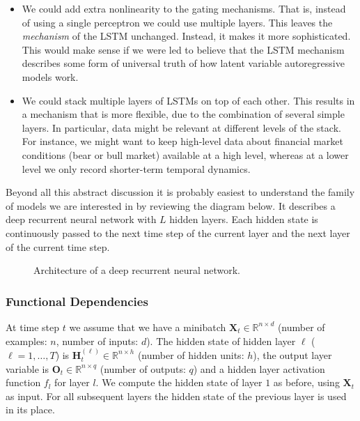 \begin{itemize}
    \item We could add extra nonlinearity to the gating mechanisms. That is, instead of using a single perceptron we could use multiple layers. This leaves the \textit{mechanism} of the LSTM unchanged. Instead, it makes it more sophisticated. This would make sense if we were led to believe that the LSTM mechanism describes some form of universal truth of how latent variable autoregressive models work.
    \item We could stack multiple layers of LSTMs on top of each other. This results in a mechanism that is more flexible, due to the combination of several simple layers. In particular, data might be relevant at different levels of the stack. For instance, we might want to keep high-level data about financial market conditions (bear or bull market) available at a high level, whereas at a lower level we only record shorter-term temporal dynamics.
\end{itemize}

Beyond all this abstract discussion it is probably easiest to understand the family of models we are interested in by reviewing the diagram below. It describes a deep recurrent neural network with $L$ hidden layers. Each hidden state is continuously passed to the next time step of the current layer and the next layer of the current time step.

\begin{figure}[hpt]
    \centering
    
    \caption{Architecture of a deep recurrent neural network.}
    \label{fig:deep-rnn}
\end{figure}

\subsubsection{Functional Dependencies}

At time step $t$ we assume that we have a minibatch $\mathbf{X}_t \in \mathbb{R}^{n \times d}$ (number of examples: $n$, number of inputs: $d$). The hidden state of hidden layer $\ell$ ($\ell=1,\ldots,T$) is $\mathbf{H}_t^{(\ell)}  \in \mathbb{R}^{n \times h}$ (number of hidden units: $h$), the output layer variable is $\mathbf{O}_t \in \mathbb{R}^{n \times q}$ (number of outputs: $q$) and a hidden layer activation function $f_l$ for layer $l$. We compute the hidden state of layer $1$ as before, using $\mathbf{X}_t$ as input. For all subsequent layers the hidden state of the previous layer is used in its place.

